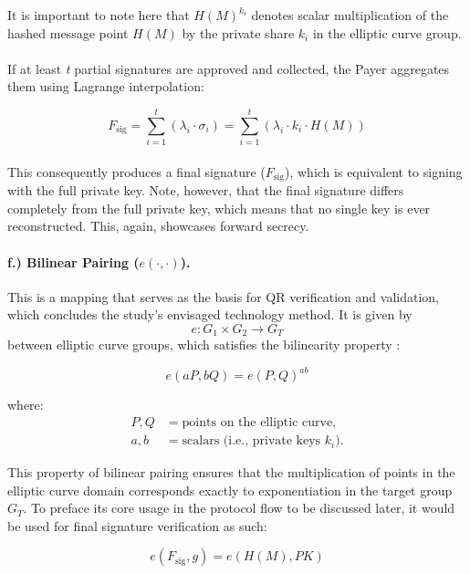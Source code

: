\documentclass[a4paper]{scl-article}
\begin{document}
It is important to note here that $H(M)^{k_i}$ denotes scalar multiplication of the hashed message point $H(M)$ by the private share $k_i$ in the elliptic curve group.

\paragraph{}If at least \textit{t} partial signatures are approved and collected, the Payer aggregates them using Lagrange interpolation:

\[
F_{\text{sig}} = \sum_{i=1}^{t} (\lambda_i \cdot \sigma_i)
              = \sum_{i=1}^{t} (\lambda_i \cdot k_i \cdot H(M))
\]

\paragraph{}This consequently produces a final signature ($F_{\text{sig}}$), which is equivalent to signing with the full private key. Note, however, that the final signature differs completely from the full private key, which means that no single key is ever reconstructed. This, again, showcases forward secrecy.

\paragraph{f.) Bilinear Pairing ($e(\cdot,\cdot)$).}

This is a mapping that serves as the basis for QR verification and validation, which concludes the study’s envisaged technology method. It is given by
\[
e: G_1 \times G_2 \rightarrow G_T
\]
between elliptic curve groups, which satisfies the bilinearity property \cite{john2023}:

\[
e(aP, bQ) = e(P, Q)^{ab}
\]

\noindent where:
\begin{align*}
P, Q & = \text{points on the elliptic curve}, \\
a, b & = \text{scalars (i.e., private keys $k_i$)}.
\end{align*}

This property of bilinear pairing ensures that the multiplication of points in the elliptic curve domain corresponds exactly to exponentiation in the target group $G_T$. To preface its core usage in the protocol flow to be discussed later, it would be used for final signature verification as such:

\[
e(F_{\text{sig}}, g) = e(H(M), PK)
\]
\end{document}
